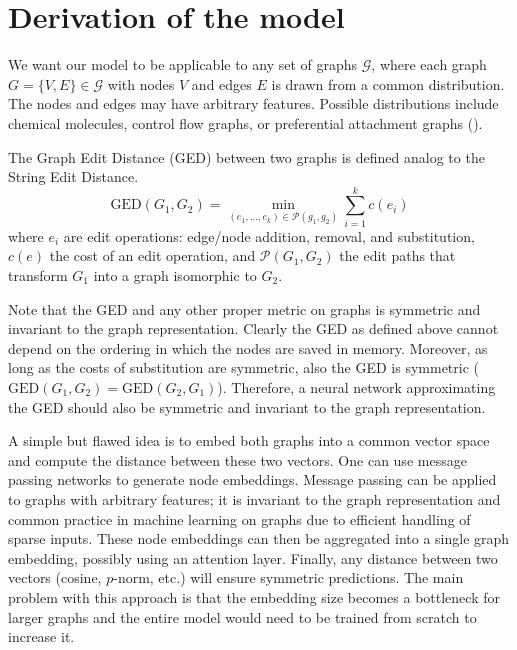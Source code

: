 \section{Derivation of the model}

We want our model to be applicable to any set of graphs $\mathcal{G}$, where each graph $G = \{V, E\} \in \mathcal{G}$ with nodes $V$ and edges $E$ is drawn from a common distribution. The nodes and edges may have arbitrary features. Possible distributions include chemical molecules, control flow graphs, or preferential attachment graphs (\citealp{pref_att2002}).

The Graph Edit Distance (GED) between two graphs is defined analog to the String Edit Distance.
\begin{equation}
     \text{GED}(G_{1},G_{2}) = \min_{(e_{1},...,e_{k}) \in \mathcal{P}(g_{1},g_{2})} \sum_{i=1}^{k} c(e_{i})
\end{equation}
where $e_{i}$ are edit operations: edge/node addition, removal, and substitution, $c(e)$ the cost of an edit operation, and $\mathcal{P}(G_{1},G_{2})$ the edit paths that transform $G_{1}$ into a graph isomorphic to $G_{2}$.

Note that the GED and any other proper metric on graphs is symmetric and invariant to the graph representation. Clearly the GED as defined above cannot depend on the ordering in which the nodes are saved in memory. Moreover, as long as the costs of substitution are symmetric, also the GED is symmetric ($\text{GED}(G_{1},G_{2}) = \text{GED}(G_{2},G_{1})$). Therefore, a neural network approximating the GED should also be symmetric and invariant to the graph representation.

A simple but flawed idea is to embed both graphs into a common vector space and compute the distance between these two vectors. One can use message passing networks to generate node embeddings. Message passing can be applied to graphs with arbitrary features; it is invariant to the graph representation and common practice in machine learning on graphs due to efficient handling of sparse inputs. These node embeddings can then be aggregated into a single graph embedding, possibly using an attention layer. Finally, any distance between two vectors (cosine, $p$-norm, etc.) will ensure symmetric predictions. The main problem with this approach is that the embedding size becomes a bottleneck for larger graphs and the entire model would need to be trained from scratch to increase it.


